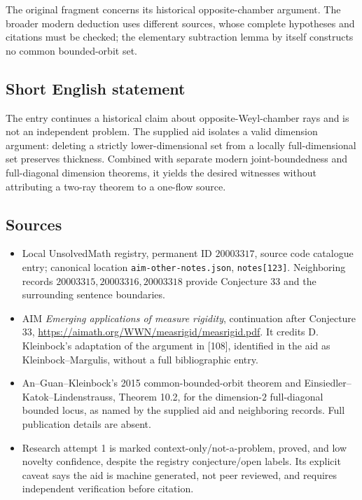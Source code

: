 \documentclass[11pt]{article}
\begin{document}
The original fragment concerns its historical opposite-chamber argument. The broader modern deduction uses different sources, whose complete hypotheses and citations must be checked; the elementary subtraction lemma by itself constructs no common bounded-orbit set.
\subsection{Short English statement}
The entry continues a historical claim about opposite-Weyl-chamber rays and is not an independent problem. The supplied aid isolates a valid dimension argument: deleting a strictly lower-dimensional set from a locally full-dimensional set preserves thickness. Combined with separate modern joint-boundedness and full-diagonal dimension theorems, it yields the desired witnesses without attributing a two-ray theorem to a one-flow source.
\subsection{Sources}
\begin{itemize}
\item Local UnsolvedMath registry, permanent ID $20003317$, source code catalogue entry; canonical location \texttt{aim-other-notes.json}, \texttt{notes[123]}. Neighboring records $20003315,20003316,20003318$ provide Conjecture 33 and the surrounding sentence boundaries.
\item AIM \emph{Emerging applications of measure rigidity}, continuation after Conjecture 33, \url{https://aimath.org/WWN/measrigid/measrigid.pdf}. It credits D. Kleinbock's adaptation of the argument in [108], identified in the aid as Kleinbock--Margulis, without a full bibliographic entry.
\item An--Guan--Kleinbock's 2015 common-bounded-orbit theorem and Einsiedler--Katok--Lindenstrauss, Theorem 10.2, for the dimension-$2$ full-diagonal bounded locus, as named by the supplied aid and neighboring records. Full publication details are absent.
\item Research attempt 1 is marked context-only/not-a-problem, proved, and low novelty confidence, despite the registry conjecture/open labels. Its explicit caveat says the aid is machine generated, not peer reviewed, and requires independent verification before citation.
\end{itemize}
\end{document}
